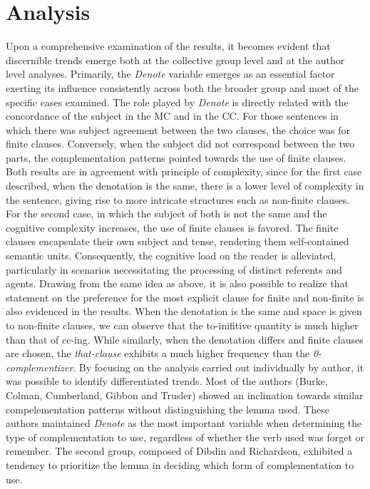 \documentclass[final]{clv3} %
\begin{document}
\section{Analysis}
Upon a comprehensive examination of the results, it becomes evident that discernible trends emerge both at the collective group level and at the author level analyses. Primarily, the \textit{Denote} variable emerges as an essential factor exerting its influence consistently across both the broader group and most of the specific cases examined. The role played by \textit{Denote} is directly related with the concordance of the subject in the MC and in the CC.  For those sentences in which there was subject agreement between the two clauses, the choice was for finite clauses. Conversely, when the subject did not correspond between the two parts, the complementation patterns pointed towards the use of finite clauses.  Both results are in agreement with \citet{rohdenburg1996cognitive} principle of complexity, since for the first case described, when the denotation is the same, there is a lower level of complexity in the sentence, giving rise to more intricate structures such as non-finite clauses. For the second case, in which the subject of both is not the same and the cognitive complexity increases, the use of finite clauses is favored. The finite clauses encapsulate their own subject and tense, rendering them self-contained semantic units. Consequently, the cognitive load on the reader is alleviated, particularly in scenarios necessitating the processing of distinct referents and agents.
Drawing from the same idea as above, it is also possible to realize that \citet{rohdenburg1996cognitive} statement on the preference for the most explicit clause for finite and non-finite is also evidenced in the results. When the denotation is the same and space is given to non-finite clauses, we can observe that the to-inifitive quantity is much higher than that of cc-ing. While similarly, when the denotation differs and finite clauses are chosen, the \textit{that-clause} exhibits a much higher frequency than the \textit{0-complementizer}.
By focusing on the analysis carried out individually by author, it was possible to identify differentiated trends. Most of the authors (Burke, Colman, Cumberland, Gibbon and Trusler) showed an inclination towards similar compelementation patterns without distinguishing the lemma used. These authors maintained \textit{Denote} as the most important variable when determining the type of complementation to use, regardless of whether the verb used was forget or remember. The second group, composed of Dibdin and Richardson, exhibited a tendency to prioritize the lemma in deciding which form of complementation to use.
\end{document}
